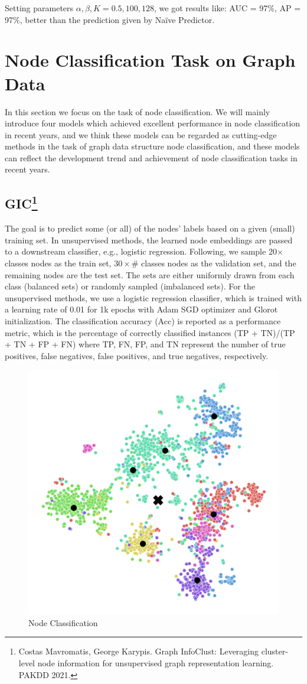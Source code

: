 \documentclass[11pt]{article}
\begin{document}
Setting parameters $\alpha,\beta,K=0.5,100,128$, we got results like: AUC = 97\%, AP = 97\%, better than the prediction given by Naïve Predictor.

\section{Node Classification Task on Graph Data}

In this section we focus on the task of node classification. We will mainly introduce four models which achieved excellent performance in node classification in recent years, and we think these models can be regarded as cutting-edge methods in the task of graph data structure node classification, and these models can reflect the development trend and achievement of node classification tasks in recent years.

\subsection{GIC\footnote{Costas Mavromatis, George Karypis. Graph InfoClust: Leveraging cluster-level node information for unsupervised graph representation learning. PAKDD 2021.}}

The goal is to predict some (or all) of the nodes’ labels based on a given (small) training set. In unsupervised methods, the learned node embeddings are passed to a downstream classifier, e.g., logistic regression. Following, we sample 20$\times$classes nodes as the train set, $30\times\texttt{\#}$ classes nodes as the validation set, and the remaining nodes are the test set. The sets are either uniformly drawn from each class (balanced sets) or randomly sampled (imbalanced sets). For the unsupervised methods, we use a logistic regression classifier, which is trained with a learning rate of 0.01 for 1k epochs with Adam SGD optimizer and Glorot initialization. The classification accuracy (Acc) is reported as a performance metric, which is the percentage of correctly classified instances (TP + TN)/(TP + TN + FP + FN) where TP, FN, FP, and TN represent the number of true positives, false negatives, false positives, and true negatives, respectively.
\begin{figure}[H]
	\centering
	\includegraphics[width=.25\linewidth]{graphs/GIC.PNG}
	\caption{Node Classification}
\end{figure}
\end{document}
